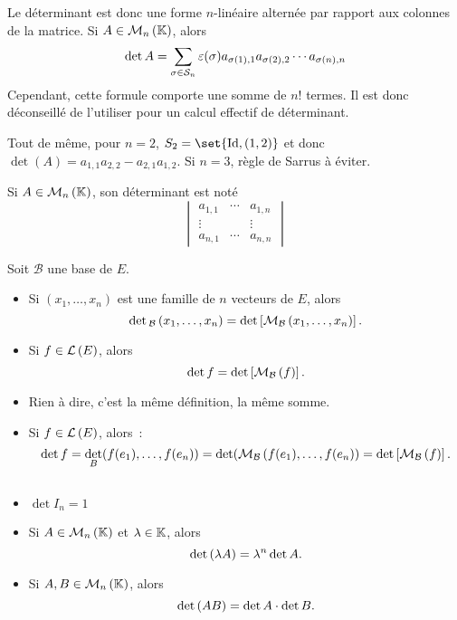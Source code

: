 \documentclass{magnolia}
\begin{document}
\begin{remarques}
\remarque Le déterminant est donc une forme $n$-linéaire alternée par rapport aux
  colonnes de la matrice.
\remarque Si $A\in\mathcal{M}_{n}\left(\mathbb{K}\right)$, alors
  \[\det A=\sum_{\sigma\in\gsym{n}} \signat{\sigma}
    a_{\sigma\p{1},1}a_{\sigma\p{2},2}\cdots a_{\sigma(n),n}\]
  Cependant, cette formule comporte une somme de $n!$ termes. Il est donc déconseillé de l'utiliser
  pour un calcul effectif de déterminant.
  \begin{sol}
  Tout de même, pour $n=2$, $S_2=\set{\id,(1,2)}$ et donc $\det(A)=a_{1,1}a_{2,2}-a_{2,1}a_{1,2}$.
  Si $n=3$, règle de Sarrus à éviter.
  \end{sol}
\remarque Si $A\in\mathcal{M}_{n}\left(\mathbb{K}\right)$, son déterminant est noté
  \[\begin{vmatrix}
    a_{1,1} & \cdots & a_{1,n}\\
    \vdots & & \vdots\\
    a_{n,1} & \cdots & a_{n,n}
    \end{vmatrix}\]
\end{remarques}

\begin{proposition}
Soit $\mathcal{B}$ une base de $E$.
\begin{itemize}
\item Si $(x_1,\ldots,x_n)$ est une famille de $n$ vecteurs de $E$, alors
  \[\mathop{\rm det}{}_{\mathcal{B}}\left(x_1,\ldots,x_n\right)=
    \mathop{\rm det}\left[\mathcal{M}_{\mathcal{B}}\left(x_1,\ldots,x_n\right)\right].\]
\item Si $f\in\mathcal{L}\left(E\right)$, alors
  \[\mathop{\rm det} f=\mathop{\rm det}\left[\mathcal{M}_{\mathcal{B}}\left(f\right)\right].\]
\end{itemize}
\end{proposition}

\begin{preuve}
\begin{itemize}
\item Rien à dire, c'est la même définition, la même somme.
\item Si $f\in\mathcal{L}\left(E\right)$, alors~:
  \[\mathop{\rm det} f=\mathop{\rm det}_B(f(e_1),\ldots,f(e_n))=\mathop{\rm det}(\mathcal{M}_{\mathcal{B}}\left(f(e_1),\ldots,f(e_n)\right)=\mathop{\rm det}\left[\mathcal{M}_{\mathcal{B}}\left(f\right)\right].\]
\end{itemize}

\end{preuve}

\begin{proposition}
$\quad$
\begin{itemize}
\item $\det I_n=1$
\item Si $A\in\mathcal{M}_{n}\left(\mathbb{K}\right)$ et $\lambda\in\mathbb{K}$, alors
  \[\mathop{\rm det}\left(\lambda A\right)=\lambda^n \mathop{\rm det} A.\]
\item Si $A,B\in\mathcal{M}_{n}\left(\mathbb{K}\right)$, alors
  \[\mathop{\rm det}\left(AB\right)=\mathop{\rm det} A\cdot\mathop{\rm det} B.\]
\end{itemize}
\end{proposition}
\end{document}
